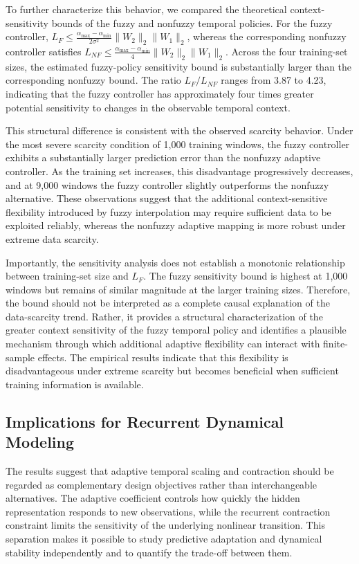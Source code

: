 \documentclass[journal]{IEEEtran}
\begin{document}
To further characterize this behavior, we compared the theoretical context-sensitivity bounds of the fuzzy and nonfuzzy temporal policies. For the fuzzy controller, $L_F\leq\frac{\alpha_{\max}-\alpha_{\min}}{2\sigma^2}\|W_2\|_2\|W_1\|_2$, whereas the corresponding nonfuzzy controller satisfies $L_{NF}\leq\frac{\alpha_{\max}-\alpha_{\min}}{4}\|W_2\|_2\|W_1\|_2$. Across the four training-set sizes, the estimated fuzzy-policy sensitivity bound is substantially larger than the corresponding nonfuzzy bound. The ratio $L_F/L_{NF}$ ranges from 3.87 to 4.23, indicating that the fuzzy controller has approximately four times greater potential sensitivity to changes in the observable temporal context.

This structural difference is consistent with the observed scarcity behavior. Under the most severe scarcity condition of 1,000 training windows, the fuzzy controller exhibits a substantially larger prediction error than the nonfuzzy adaptive controller. As the training set increases, this disadvantage progressively decreases, and at 9,000 windows the fuzzy controller slightly outperforms the nonfuzzy alternative. These observations suggest that the additional context-sensitive flexibility introduced by fuzzy interpolation may require sufficient data to be exploited reliably, whereas the nonfuzzy adaptive mapping is more robust under extreme data scarcity.

Importantly, the sensitivity analysis does not establish a monotonic relationship between training-set size and $L_F$. The fuzzy sensitivity bound is highest at 1,000 windows but remains of similar magnitude at the larger training sizes. Therefore, the bound should not be interpreted as a complete causal explanation of the data-scarcity trend. Rather, it provides a structural characterization of the greater context sensitivity of the fuzzy temporal policy and identifies a plausible mechanism through which additional adaptive flexibility can interact with finite-sample effects. The empirical results indicate that this flexibility is disadvantageous under extreme scarcity but becomes beneficial when sufficient training information is available.

	\subsection{Implications for Recurrent Dynamical Modeling}
	\label{subsec:implications}
	
	The results suggest that adaptive temporal scaling and contraction should be regarded as complementary design objectives rather than interchangeable alternatives. The adaptive coefficient controls how quickly the hidden representation responds to new observations, while the recurrent contraction constraint limits the sensitivity of the underlying nonlinear transition. This separation makes it possible to study predictive adaptation and dynamical stability independently and to quantify the trade-off between them.
	
\end{document}
